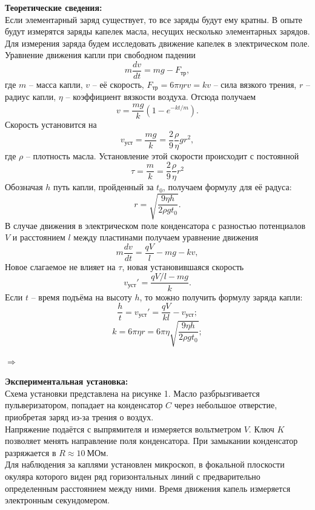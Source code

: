 \documentclass[a4paper, 12pt]{article}%
\begin{document}
	\textbf{Теоретические сведения: }\\
	Если элементарный заряд существует, то все заряды будут ему кратны. В опыте будут измерятся заряды капелек масла, несущих несколько элементарных зарядов.\\
	Для измерения заряда будем исследовать движение капелек в электрическом поле. Уравнение движения капли при свободном падении
	\begin{equation}
		m \dfrac{dv}{dt}=mg-F_{\text{тр}},
	\end{equation}
	где $m$ -- масса капли, $v$ -- её скорость, $F_{\text{тр}}=6\pi \eta rv = kv$ -- сила вязкого трения, $r$ -- радиус капли, $\eta$ -- коэффициент вязкости воздуха. Отсюда получаем 
	\begin{equation}
		v = \dfrac{mg}{k}\left(1 - e^{-kt/m}\right).
	\end{equation}
	Скорость установится на
	$$
	v_{\text{уст}}=\dfrac{mg}{k}=\dfrac{2}{9}\dfrac{\rho}{\eta}gr^2,
	$$
	где $\rho$ -- плотность масла. Установление этой скорости происходит с постоянной
	$$
	\tau = \dfrac{m}{k}=\dfrac{2}{9}\dfrac{\rho}{\eta}r^2
	$$
	Обозначая $h$ путь капли, пройденный за $t_0$, получаем формулу для её радуса:
	\begin{equation}
		r = \sqrt{\dfrac{9\eta h}{2\rho gt_0}}.
	\end{equation}
	В случае движения в электрическом поле конденсатора с разностью потенциалов $V$ и расстоянием $l$ между пластинами получаем уравнение движения
	\begin{equation}
		m \dfrac{dv}{dt}=\dfrac{qV}{l}-mg-kv,
	\end{equation}
	Новое слагаемое не влияет на $\tau$, новая установившаяся скорость
	$$
	v_{\text{уст}}'=\dfrac{qV/l - mg}{k}.
	$$
	Если $t$ -- время подъёма на высоту $h$, то можно получить формулу заряда капли:
	$$
	\dfrac{h}{t} = v_{\text{уст}}' = \dfrac{qV}{kl}-v_{\text{уст}};
	$$
	$$
	k=6\pi \eta r  = 6\pi \eta  \sqrt{\dfrac{9\eta h}{2\rho gt_0}};
	$$
	\begin{center}
		$\Rightarrow$ 
	\end{center}
	\textbf{Экспериментальная установка: }\\

	Схема установки представлена на рисунке 1. Масло разбрызгивается пульверизатором, попадает на конденсатор $C$ через небольшое отверстие, приобретая заряд из-за трения о воздух.\\
	Напряжение подаётся с выпрямителя и измеряется вольтметром $V$. Ключ $K$ позволяет менять направление поля конденсатора. При замыкании конденсатор разряжается в $R \approx 10~\text{МОм}$.\\
	Для наблюдения за каплями установлен микроскоп, в фокальной плоскости окуляра которого  виден ряд горизонтальных линий с предварительно определенным расстоянием между ними. Время движения капель измеряется электронным секундомером.
	
\end{document}
